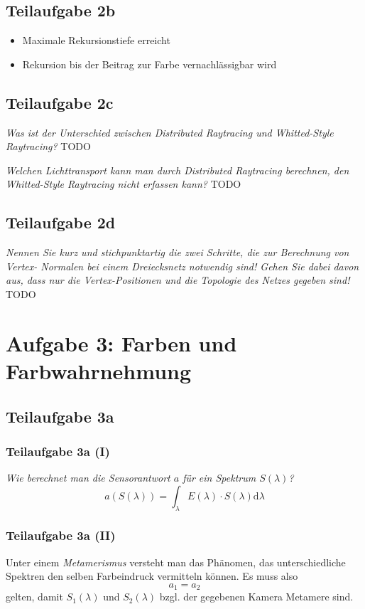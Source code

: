 \documentclass[a4paper]{scrartcl}
\begin{document}
\subsection*{Teilaufgabe 2b}
\begin{itemize}
    \item Maximale Rekursionstiefe erreicht
    \item Rekursion bis der Beitrag zur Farbe vernachlässigbar wird
\end{itemize}

\subsection*{Teilaufgabe 2c}

\textit{Was ist der Unterschied zwischen Distributed Raytracing und Whitted-Style Raytracing?}
TODO

\textit{Welchen Lichttransport kann man durch Distributed Raytracing berechnen, den
Whitted-Style Raytracing nicht erfassen kann?}
TODO

\subsection*{Teilaufgabe 2d}
\textit{Nennen Sie kurz und stichpunktartig die zwei Schritte, die zur Berechnung von Vertex-
Normalen bei einem Dreiecksnetz notwendig sind! Gehen Sie dabei davon aus, dass nur
die Vertex-Positionen und die Topologie des Netzes gegeben sind!}
TODO

\clearpage
\section*{Aufgabe 3: Farben und Farbwahrnehmung}
\subsection*{Teilaufgabe 3a}
\subsubsection*{Teilaufgabe 3a (I)}
\textit{Wie berechnet man die Sensorantwort $a$ für ein Spektrum $S(\lambda)$?}
\[a(S(\lambda)) = \int_\lambda E(\lambda) \cdot S(\lambda) \mathrm{d} \lambda \]

\subsubsection*{Teilaufgabe 3a (II)}
Unter einem \textit{Metamerismus} versteht man das Phänomen, das
unterschiedliche Spektren den selben Farbeindruck vermitteln können. Es muss
also
\[a_1 = a_2\]
gelten, damit $S_1(\lambda)$ und $S_2(\lambda)$ bzgl. der gegebenen Kamera
Metamere sind.
\end{document}

